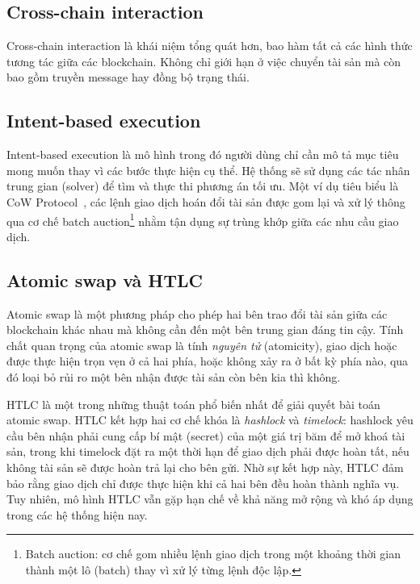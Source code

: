 \subsection*{Cross-chain interaction}

Cross-chain interaction là khái niệm tổng quát hơn, 
bao hàm tất cả các hình thức tương tác giữa các blockchain. 
Không chỉ giới hạn ở việc chuyển tài sản mà còn bao gồm truyền message hay đồng bộ trạng thái. 

\subsection*{Intent-based execution}

Intent-based execution là mô hình trong đó người dùng chỉ cần mô tả mục tiêu mong muốn 
thay vì các bước thực hiện cụ thể. 
Hệ thống sẽ sử dụng các tác nhân trung gian (solver) để tìm và thực thi phương án tối ưu. 
Một ví dụ tiêu biểu là CoW Protocol~\cite{cow_protocol_docs},
các lệnh giao dịch hoán đổi tài sản được gom lại và xử lý thông qua cơ chế 
batch auction\footnote{Batch auction: cơ chế gom nhiều lệnh giao dịch trong một khoảng thời gian thành một lô (batch) thay vì xử lý từng lệnh độc lập.}
nhằm tận dụng sự 
trùng khớp giữa các nhu cầu giao dịch.

\subsection*{Atomic swap và HTLC}

Atomic swap là một phương pháp cho phép hai bên trao đổi tài sản giữa các blockchain khác nhau mà
không cần đến một bên trung gian đáng tin cậy. 
Tính chất quan trọng của atomic swap là tính \textit{nguyên tử} (atomicity), 
giao dịch hoặc được thực hiện trọn vẹn ở cả hai phía, hoặc không xảy ra ở bất kỳ phía nào, 
qua đó loại bỏ rủi ro một bên nhận được tài sản còn bên kia thì không.


HTLC là một trong những thuật toán phổ biến nhất để giải quyết bài toán
atomic swap.
HTLC kết hợp hai cơ chế khóa là \textit{hashlock} và \textit{timelock}: 
hashlock yêu cầu bên nhận phải cung cấp bí mật (secret) của một giá trị băm để mở khoá tài sản, 
trong khi timelock đặt ra một thời hạn để giao dịch phải được hoàn tất, 
nếu không tài sản sẽ được hoàn trả lại cho bên gửi. 
Nhờ sự kết hợp này, HTLC đảm bảo rằng giao dịch chỉ được thực hiện khi cả hai bên đều hoàn thành 
nghĩa vụ. 
Tuy nhiên, mô hình HTLC vẫn gặp hạn chế về khả năng mở rộng và khó áp dụng trong các hệ 
thống hiện nay.

